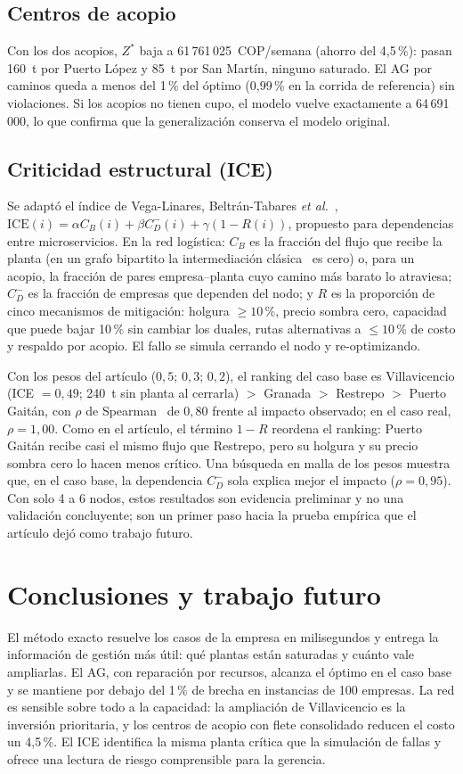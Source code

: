 \documentclass[conference]{IEEEtran}
\begin{document}
\subsection{Centros de acopio}
Con los dos acopios, $Z^*$ baja a 61\,761\,025~COP/semana (ahorro del 4{,}5\,\%): pasan 160~t por
Puerto López y 85~t por San Martín, ninguno saturado. El AG por caminos queda a menos del 1\,\% del
óptimo (0{,}99\,\% en la corrida de referencia) sin violaciones. Si los acopios no tienen cupo, el modelo vuelve exactamente a
64\,691\,000, lo que confirma que la generalización conserva el modelo original.

\subsection{Criticidad estructural (ICE)}
Se adaptó el índice de Vega-Linares, Beltrán-Tabares \emph{et al.}~\cite{ice},
$\mathrm{ICE}(i)=\alpha C_B(i)+\beta C_D^-(i)+\gamma(1-R(i))$, propuesto para dependencias entre
microservicios. En la red logística: $C_B$ es la fracción del flujo que recibe la planta (en un grafo
bipartito la intermediación clásica~\cite{freeman} es cero) o, para un acopio, la fracción de pares
empresa–planta cuyo camino más barato lo atraviesa; $C_D^-$ es la fracción de empresas que dependen
del nodo; y $R$ es la proporción de cinco mecanismos de mitigación: holgura $\ge 10$\,\%, precio
sombra cero, capacidad que puede bajar 10\,\% sin cambiar los duales, rutas alternativas a
$\le 10$\,\% de costo y respaldo por acopio. El fallo se simula cerrando el nodo y re-optimizando.

Con los pesos del artículo ($0{,}5$; $0{,}3$; $0{,}2$), el ranking del caso base es Villavicencio
(ICE $=0{,}49$; 240~t sin planta al cerrarla) $>$ Granada $>$ Restrepo $>$ Puerto Gaitán, con
$\rho$ de Spearman~\cite{spearman} de $0{,}80$ frente al impacto observado; en el caso real,
$\rho = 1{,}00$. Como en el artículo, el término $1-R$ reordena el ranking: Puerto Gaitán recibe casi el
mismo flujo que Restrepo, pero su holgura y su precio sombra cero lo hacen menos crítico. Una búsqueda
en malla de los pesos muestra que, en el caso base, la dependencia $C_D^-$ sola explica mejor el
impacto ($\rho=0{,}95$). Con solo 4 a 6 nodos, estos resultados son evidencia preliminar y no una
validación concluyente; son un primer paso hacia la prueba empírica que el artículo dejó como
trabajo futuro.

\section{Conclusiones y trabajo futuro}
El método exacto resuelve los casos de la empresa en milisegundos y entrega la información de gestión
más útil:
qué plantas están saturadas y cuánto vale ampliarlas. El AG, con reparación por recursos, alcanza el
óptimo en el caso base y se mantiene por debajo del 1\,\% de brecha en instancias de 100 empresas. La
red es sensible sobre todo a la capacidad: la ampliación de Villavicencio es la inversión prioritaria,
y los centros de acopio con flete consolidado reducen el costo un 4{,}5\,\%. El ICE identifica la
misma planta crítica que la simulación de fallas y ofrece una lectura de riesgo comprensible para la
gerencia.
\end{document}
